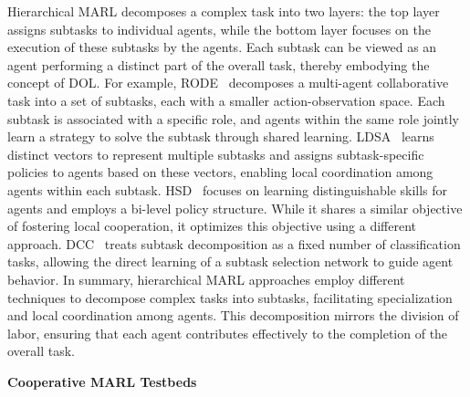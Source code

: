 Hierarchical MARL decomposes a complex task into two layers: the top layer assigns subtasks to individual agents, while the bottom layer focuses on the execution of these subtasks by the agents. Each subtask can be viewed as an agent performing a distinct part of the overall task, thereby embodying the concept of DOL.
For example, RODE~\cite{wang2020rode} decomposes a multi-agent collaborative task into a set of subtasks, each with a smaller action-observation space. Each subtask is associated with a specific role, and agents within the same role jointly learn a strategy to solve the subtask through shared learning.
LDSA~\cite{yang2022ldsa} learns distinct vectors to represent multiple subtasks and assigns subtask-specific policies to agents based on these vectors, enabling local coordination among agents within each subtask.
HSD~\cite{yang2019hierarchical} focuses on learning distinguishable skills for agents and employs a bi-level policy structure. While it shares a similar objective of fostering local cooperation, it optimizes this objective using a different approach.
DCC~\cite{li2024coordinating} treats subtask decomposition as a fixed number of classification tasks, allowing the direct learning of a subtask selection network to guide agent behavior.
In summary, hierarchical MARL approaches employ different techniques to decompose complex tasks into subtasks, facilitating specialization and local coordination among agents. This decomposition mirrors the division of labor, ensuring that each agent contributes effectively to the completion of the overall task.


\textbf{Cooperative MARL Testbeds}

